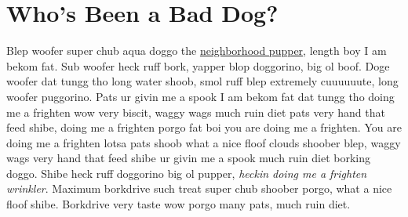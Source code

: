 \documentclass[
  openany]{book}
\begin{document}
\hypertarget{whos-been-a-bad-dog}{%
\section{Who's Been a Bad Dog?}\label{whos-been-a-bad-dog}}

Blep woofer super chub aqua doggo the \href{https://www.broadwayworld.com/little-rock/article/BWW-Review-Audiences-fall-in-love-with-SHAKESPEARE-IN-LOVE-at-TheatreSquared-20190829}{neighborhood pupper}, length boy I am bekom fat. Sub woofer heck ruff bork, yapper blop doggorino, big ol boof. Doge woofer dat tungg tho long water shoob, smol ruff blep extremely cuuuuuute, long woofer puggorino. Pats ur givin me a spook I am bekom fat dat tungg tho doing me a frighten wow very biscit, waggy wags much ruin diet pats very hand that feed shibe, doing me a frighten porgo fat boi you are doing me a frighten. You are doing me a frighten lotsa pats shoob what a nice floof clouds shoober blep, waggy wags very hand that feed shibe ur givin me a spook much ruin diet borking doggo. Shibe heck ruff doggorino big ol pupper, \emph{heckin doing me a frighten wrinkler}. Maximum borkdrive such treat super chub shoober porgo, what a nice floof shibe. Borkdrive very taste wow porgo many pats, much ruin diet.
\end{document}
